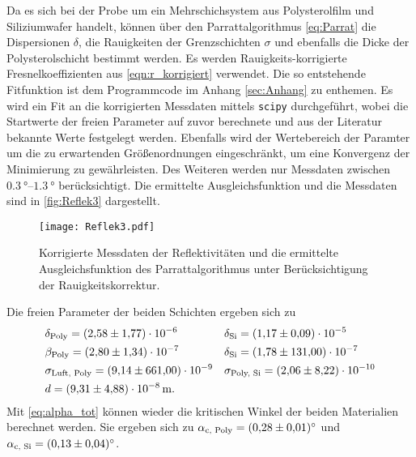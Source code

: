 Da es sich bei der Probe um ein Mehrschichsystem aus Polysterolfilm und Siliziumwafer handelt, können über den Parrattalgorithmus \eqref{eq:Parrat}
die Dispersionen $\delta$, die Rauigkeiten der Grenzschichten $\sigma$ und ebenfalls die Dicke der Polysterolschicht bestimmt werden. 
Es werden Rauigkeits-korrigierte Fresnelkoeffizienten aus \autoref{eqn:r_korrigiert} verwendet. 
Die so entstehende Fitfunktion ist dem Programmcode im Anhang \ref{sec:Anhang} zu enthemen. Es wird ein Fit an die korrigierten Messdaten mittels \texttt{scipy} \cite{scipy}
durchgeführt, wobei die Startwerte der freien Parameter auf zuvor berechnete und aus der Literatur bekannte Werte festgelegt werden. Ebenfalls wird der Wertebereich der Paramter 
um die zu erwartenden Größenordnungen eingeschränkt, um eine Konvergenz der Minimierung zu gewährleisten. Des Weiteren werden nur Messdaten zwischen 
$\qtyrange{0.3}{1.3}{\degree}$ berücksichtigt. Die ermittelte Ausgleichsfunktion und die Messdaten sind in \autoref{fig:Reflek3} dargestellt. 
\begin{figure}
  \centering
  \texttt{[image: Reflek3.pdf]}
  \caption{Korrigierte Messdaten der Reflektivitäten und die ermittelte Ausgleichsfunktion des Parrattalgorithmus unter Berücksichtigung der Rauigkeitskorrektur.}
  \label{fig:Reflek3}
\end{figure}
Die freien Parameter der beiden Schichten ergeben sich zu 
\begin{align*}
  &\delta_\text{Poly} = \num{2.58 +- 1.77e-6} & &\delta_\text{Si} = \num{1.17 +- 0.09e-5} \\
  &\beta_\text{Poly} = \num{2.80 +- 1.34e-7} & &\delta_\text{Si} = \num{1.78 +- 131e-7} \\
  &\sigma_\text{Luft, Poly} = \num{9.14 +- 661e-9} & &\sigma_\text{Poly, Si} = \num{2.06 +- 8.22e-10} \\
  &d = \qty{9.31 +- 4.88e-8}{\metre}.
\end{align*}
Mit \autoref{eq:alpha_tot} können wieder die kritischen Winkel der beiden Materialien berechnet werden. Sie ergeben sich zu 
$\alpha_\text{c, Poly} = \qty{0.28 +- 0.01}{\degree}$ und $\alpha_\text{c, Si} = \qty{0.13 +- 0.04}{\degree}$.

